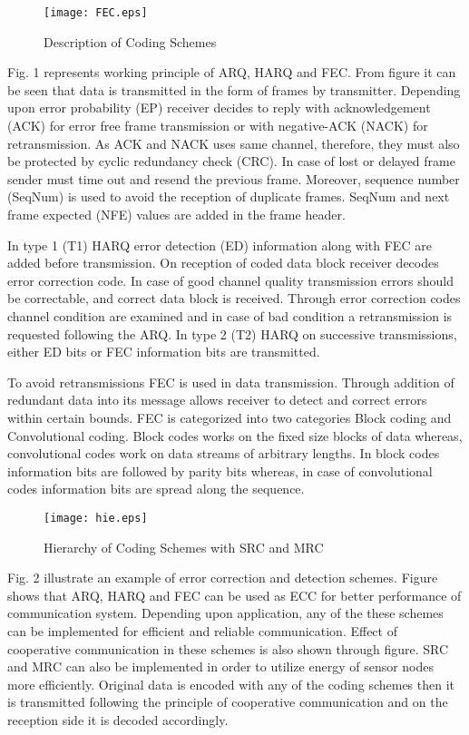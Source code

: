 \documentclass{sig-alternate}
\begin{document}
\begin{figure*}[!ht]
\centering
\texttt{[image: FEC.eps]}
 \vspace{-.4cm}
\caption{Description of Coding Schemes}
\end{figure*}

Fig. 1 represents working principle of ARQ, HARQ and FEC.  From figure it can be seen that data is transmitted in the form of frames by transmitter. Depending upon error probability (EP) receiver decides to reply with acknowledgement (ACK) for error free frame transmission or with negative-ACK (NACK) for retransmission. As ACK and NACK uses same channel, therefore,  they must also be protected by cyclic redundancy check (CRC). In case of lost or delayed frame sender must time out and resend the previous frame. Moreover, sequence number (SeqNum) is used to avoid the reception of duplicate frames. SeqNum and next frame expected (NFE) values are added in the frame header.

In type 1 (T1) HARQ  error detection (ED) information along with FEC are added before transmission. On reception of coded data block receiver decodes error correction code. In case of good channel quality transmission errors should be correctable, and correct data block is received. Through error correction codes channel condition are examined and in case of bad condition a retransmission is requested following the ARQ. In type 2 (T2) HARQ on successive transmissions, either ED bits or FEC information bits are transmitted.

To avoid retransmissions FEC is used in data transmission. Through addition of redundant data into its message allows receiver to detect and correct errors within certain bounds. FEC is categorized into two categories Block coding and Convolutional coding. Block codes works on the fixed size blocks of data  whereas, convolutional codes work on data streams of arbitrary lengths. In block codes information bits are followed by parity bits whereas, in case of convolutional codes information bits are spread along the sequence.
\begin{figure}[!ht]
  \centering
\texttt{[image: hie.eps]}
    \vspace{-.2cm}
  \caption{Hierarchy of Coding Schemes with SRC and MRC}
\end{figure}

Fig. 2 illustrate an example of error correction and detection schemes. Figure shows that ARQ, HARQ and FEC can be used as ECC for better performance of communication system. Depending upon application, any of the these schemes can be implemented for efficient and reliable communication. Effect of cooperative communication in these schemes is also shown through figure. SRC and MRC can also be implemented in order to utilize energy of sensor nodes more efficiently. Original data is encoded with any of the coding schemes then it is transmitted following the principle of cooperative communication and on the reception side it is decoded accordingly.
\end{document}
